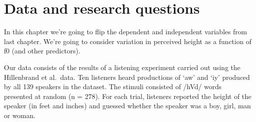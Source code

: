 \documentclass[
]{book}
\newenvironment{Shaded}{\begin{snugshade}}{\end{snugshade}}
\newcommand{\AttributeTok}[1]{\textcolor[rgb]{0.77,0.63,0.00}{#1}}
\newcommand{\CommentTok}[1]{\textcolor[rgb]{0.56,0.35,0.01}{\textit{#1}}}
\newcommand{\FunctionTok}[1]{\textcolor[rgb]{0.00,0.00,0.00}{#1}}
\newcommand{\NormalTok}[1]{#1}
\newcommand{\OtherTok}[1]{\textcolor[rgb]{0.56,0.35,0.01}{#1}}
\newcommand{\SpecialCharTok}[1]{\textcolor[rgb]{0.00,0.00,0.00}{#1}}
\newcommand{\StringTok}[1]{\textcolor[rgb]{0.31,0.60,0.02}{#1}}
\begin{document}
\hypertarget{data-and-research-questions-5}{%
\section{Data and research questions}\label{data-and-research-questions-5}}

In this chapter we're going to flip the dependent and independent variables from last chapter. We're going to consider variation in perceived height as a function of f0 (and other predictors).

Our data consists of the results of a listening experiment carried out using the Hillenbrand et al.~data. Ten listeners heard productions of `aw' and `iy' produced by all 139 speakers in the dataset. The stimuli consisted of /hVd/ words presented at random (n = 278). For each trial, listeners reported the height of the speaker (in feet and inches) and guessed whether the speaker was a boy, girl, man or woman.

\begin{Shaded}
\end{Shaded}
\end{document}
